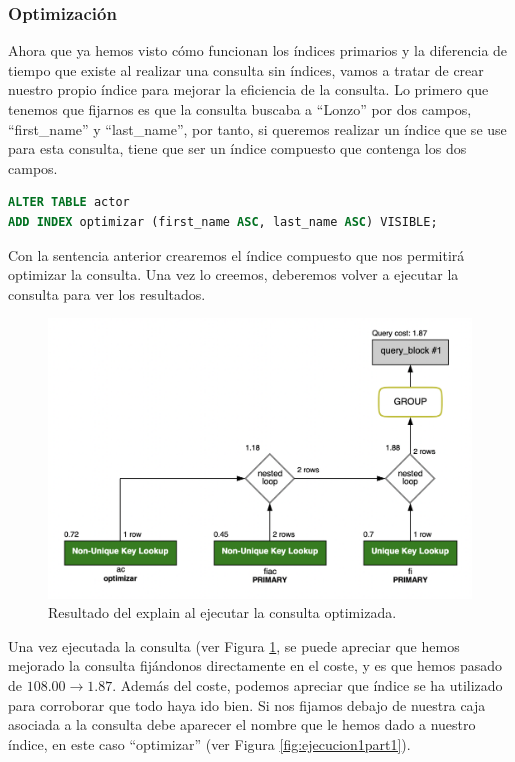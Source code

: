\documentclass[a4paper]{article}
\begin{document}
\subsubsection*{Optimización}

Ahora que ya hemos visto cómo funcionan los índices primarios y la diferencia de tiempo que existe al realizar una consulta sin índices, vamos a tratar de crear nuestro propio índice para mejorar la eficiencia de la consulta. Lo primero que tenemos que fijarnos es que la consulta buscaba a ``Lonzo'' por dos campos, ``first\_name'' y ``last\_name'', por tanto, si queremos realizar un índice que se use para esta consulta, tiene que ser un índice compuesto que contenga los dos campos.

\begin{lstlisting}[language=SQL]
ALTER TABLE actor
ADD INDEX optimizar (first_name ASC, last_name ASC) VISIBLE;
\end{lstlisting}

Con la sentencia anterior crearemos el índice compuesto que nos permitirá optimizar la consulta. Una vez lo creemos, deberemos volver a ejecutar la consulta para ver los resultados.

\begin{figure}[ht]
    \centering
    \includegraphics[width=0.8\columnwidth]{figs/ejecucion1optimizada.png}
    \caption{Resultado del explain al ejecutar la consulta optimizada.}\label{fig:ejecucion1optimizada}
\end{figure}

Una vez ejecutada la consulta (ver Figura \ref{fig:ejecucion1optimizada}, se puede apreciar que hemos mejorado la consulta fijándonos directamente en el coste, y es que hemos pasado de $108.00 \rightarrow 1.87$. Además del coste, podemos apreciar que índice se ha utilizado para corroborar que todo haya ido bien. Si nos fijamos debajo de nuestra caja asociada a la consulta debe aparecer el nombre que le hemos dado a nuestro índice, en este caso ``optimizar'' (ver Figura \ref{fig:ejecucion1part1}).
\end{document}
